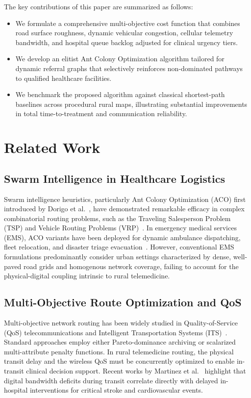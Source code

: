 \documentclass[conference]{IEEEtran}
\begin{document}
The key contributions of this paper are summarized as follows:
\begin{itemize}
    \item We formulate a comprehensive multi-objective cost function that combines road surface roughness, dynamic vehicular congestion, cellular telemetry bandwidth, and hospital queue backlog adjusted for clinical urgency tiers.
    \item We develop an elitist Ant Colony Optimization algorithm tailored for dynamic referral graphs that selectively reinforces non-dominated pathways to qualified healthcare facilities.
    \item We benchmark the proposed algorithm against classical shortest-path baselines across procedural rural maps, illustrating substantial improvements in total time-to-treatment and communication reliability.
\end{itemize}

\section{Related Work}
\subsection{Swarm Intelligence in Healthcare Logistics}
Swarm intelligence heuristics, particularly Ant Colony Optimization (ACO) first introduced by Dorigo et al.~\cite{ref_dorigo_aco}, have demonstrated remarkable efficacy in complex combinatorial routing problems, such as the Traveling Salesperson Problem (TSP) and Vehicle Routing Problems (VRP)~\cite{ref_vrp_survey}. In emergency medical services (EMS), ACO variants have been deployed for dynamic ambulance dispatching, fleet relocation, and disaster triage evacuation~\cite{ref_ems_aco}. However, conventional EMS formulations predominantly consider urban settings characterized by dense, well-paved road grids and homogenous network coverage, failing to account for the physical-digital coupling intrinsic to rural telemedicine.

\subsection{Multi-Objective Route Optimization and QoS}
Multi-objective network routing has been widely studied in Quality-of-Service (QoS) telecommunications and Intelligent Transportation Systems (ITS)~\cite{ref_qos_routing}. Standard approaches employ either Pareto-dominance archiving or scalarized multi-attribute penalty functions. In rural telemedicine routing, the physical transit delay and the wireless QoS must be concurrently optimized to enable in-transit clinical decision support. Recent works by Martinez et al.~\cite{ref_rural_telemed} highlight that digital bandwidth deficits during transit correlate directly with delayed in-hospital interventions for critical stroke and cardiovascular events.
\end{document}
